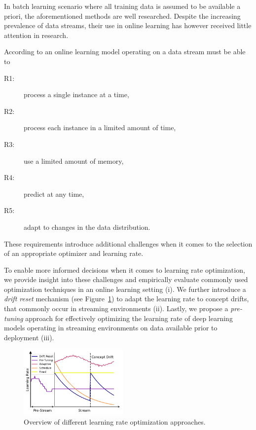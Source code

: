 \documentclass[letterpaper]{article} %
\begin{document}
In batch learning scenario where all training data is assumed to be available a priori, the aforementioned methods are well researched.
Despite the increasing prevalence of data streams, their use in online learning has however received little attention in research. 

According to \citet{bifetMOAMassiveOnline2010} an online learning model operating on a data stream must be able to
\begin{center}
	\begin{varwidth}{0.5\textwidth}
		\begin{description}
			\item[R1:] process a single instance at a time,\label{rq:single_instance}
			\item[R2:] process each instance in a limited amount of time,\label{rq:limited_time}
			\item[R3:] use a limited amount of memory,\label{rq:limited_memory}
			\item[R4:] predict at any time,\label{rq:predict_any_time}
			\item[R5:] adapt to changes in the data distribution.\label{rq:adapt_to_drift}
		\end{description}
	\end{varwidth}
\end{center}

These requirements introduce additional challenges when it comes to the selection of an appropriate optimizer and learning rate.

To enable more informed decisions when it comes to learning rate optimization, we provide insight into these challenges and empirically evaluate commonly used optimization techniques in an online learning setting (i).
We further introduce a \textit{drift reset} mechanism (see Figure~\ref{fig:lr_overview}) to adapt the learning rate to concept drifts, that commonly occur in streaming environments (ii). 
Lastly, we propose a \textit{pre-tuning} approach for effectively optimizing the learning rate of deep learning models operating in streaming environments on data available prior to deployment (iii).

\begin{figure}
	\centering
	\includegraphics[width=0.474\textwidth]{figures/lr_overview.pdf}
	\caption{Overview of different learning rate optimization approaches.}
	\label{fig:lr_overview}
\end{figure}
\end{document}
